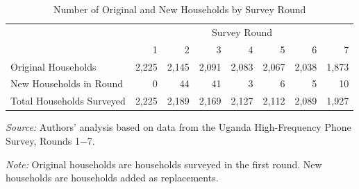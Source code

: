 \documentclass{wber}
\begin{document}
\begin{table}[hbtp!]
\begin{center}
\begin{small}
\begin{threeparttable}
\caption{Number of Original and New Households by Survey Round}
\label{tab:surveys}
\begin{tabular}{@{} l rrrrrrr @{}}
\toprule 
       & \multicolumn{7}{c}{Survey Round} \\ \cmidrule(lr){2-8} 
        & 1 & 2 & 3 & 4 & 5 & 6 & 7 \\ 
\midrule 
Original Households & 2,225 & 2,145 & 2,091 & 2,083 & 2,067 & 2,038 & 1,873 \\ 
 New Households in Round &   0 &  44 &  41 &   3 &   6 &   5 &  10 \\ 
 Total Households Surveyed & 2,225 & 2,189 & 2,169 & 2,127 & 2,112 & 2,089 & 1,927 \\ 
 \bottomrule
\end{tabular}
\begin{tablenotes}
\scriptsize
\item {\it Source:} Authors' analysis based on data from the Uganda High-Frequency Phone Survey, Rounds 1−7.
\item {\it Note:} Original households are households 
surveyed in the first round. New households are households added as replacements.
\end{tablenotes}
\end{threeparttable}
\end{small}
\end{center}
\end{table}


\end{document}
